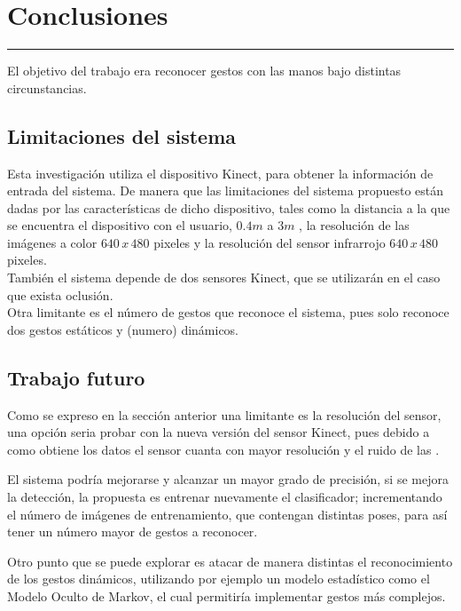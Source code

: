\chapter{Conclusiones}\label{capit:cap6}
\vspace{-2.0325ex}%
\noindent
\rule{\textwidth}{0.5pt}
\vspace{-5.5ex}%
\newcommand{\pushline}{\Indp}%

El objetivo del trabajo era reconocer gestos con las manos bajo distintas circunstancias. 


\section{Limitaciones del sistema}

Esta investigación utiliza el dispositivo Kinect, para obtener la información de entrada del sistema. De  manera que las limitaciones del sistema propuesto están dadas por las características de dicho dispositivo, tales como la distancia a la que se encuentra el dispositivo con el usuario, $0.4m$ a $3m$ , la resolución de las imágenes a color $640 \, x \, 480$ pixeles y la resolución del sensor infrarrojo $640 \, x \, 480$ pixeles.\\
También el sistema depende de dos sensores Kinect, que se utilizar\'an en el caso que exista oclusión. \\
Otra limitante es el número de gestos que reconoce el sistema, pues solo reconoce dos gestos estáticos y (numero) dinámicos.

\section{Trabajo futuro}\label{futureWork}  

Como se expreso en la sección anterior una limitante es la resolución del sensor, una opción seria probar con la nueva versión del sensor Kinect, pues debido a como obtiene los datos el sensor cuanta con mayor resolución y el ruido de las . 

El sistema podría mejorarse y alcanzar un mayor grado de precisión, si se mejora la detección, la propuesta es entrenar nuevamente el clasificador; incrementando el número de imágenes de entrenamiento, que contengan distintas poses, para así tener un número mayor de gestos a reconocer.

Otro punto que se puede explorar es atacar de manera distintas el reconocimiento de los gestos dinámicos, utilizando por ejemplo un modelo estadístico como el Modelo Oculto de Markov, el cual permitiría implementar gestos más complejos.  

\newpage
